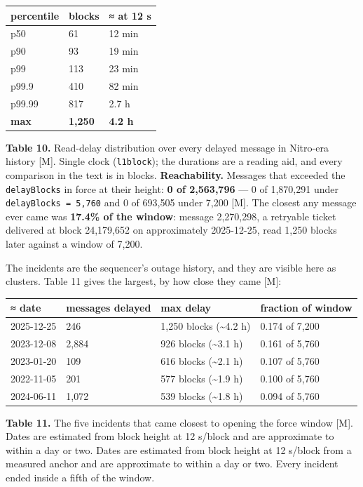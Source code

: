 \documentclass[conference]{IEEEtran}
\renewcommand{\_}{\textunderscore\allowbreak}
\begin{document}
\begin{table}[!t]
\centering
\small
\begin{tabular}{@{}lll@{}}
\toprule
percentile & blocks & ≈ at 12 s \\
\midrule
p50 & 61 & 12 min \\
p90 & 93 & 19 min \\
p99 & 113 & 23 min \\
p99.9 & 410 & 82 min \\
p99.99 & 817 & 2.7 h \\
\textbf{max} & \textbf{1,250} & \textbf{4.2 h} \\
\bottomrule
\end{tabular}
\par\vspace{5pt}
{\footnotesize\raggedright \textbf{Table 10.} Read-delay distribution over every delayed message in
Nitro-era history {[}M{]}. Single clock (\texttt{l1\_block}); the
durations are a reading aid, and every comparison in the text is in
blocks. \textbf{Reachability.} Messages that exceeded the
\texttt{delayBlocks} in force at their height: \textbf{0 of 2,563,796}
--- 0 of 1,870,291 under \texttt{delayBlocks\ =\ 5,760} and 0 of 693,505
under 7,200 {[}M{]}. The closest any message ever came was
\textbf{17.4\% of the window}: message 2,270,298, a retryable ticket
delivered at block 24,179,652 on approximately 2025-12-25, read 1,250
blocks later against a window of 7,200.\par}
\end{table}

The incidents are the sequencer's outage history, and they are visible
here as clusters. Table 11 gives the largest, by how close they came
{[}M{]}:

\begin{table}[!t]
\centering
\small
\begin{tabular}{@{}llll@{}}
\toprule
≈ date & messages delayed & max delay & fraction of window \\
\midrule
2025-12-25 & 246 & 1,250 blocks (\textasciitilde4.2 h) & 0.174 of
7,200 \\
2023-12-08 & 2,884 & 926 blocks (\textasciitilde3.1 h) & 0.161 of
5,760 \\
2023-01-20 & 109 & 616 blocks (\textasciitilde2.1 h) & 0.107 of 5,760 \\
2022-11-05 & 201 & 577 blocks (\textasciitilde1.9 h) & 0.100 of 5,760 \\
2024-06-11 & 1,072 & 539 blocks (\textasciitilde1.8 h) & 0.094 of
5,760 \\
\bottomrule
\end{tabular}
\par\vspace{5pt}
{\footnotesize\raggedright \textbf{Table 11.} The five incidents that came closest to opening the
force window {[}M{]}. Dates are estimated from block height at 12
s/block and are approximate to within a day or two. Dates are estimated
from block height at 12 s/block from a measured anchor and are
approximate to within a day or two. Every incident ended inside a fifth
of the window.\par}
\end{table}
\end{document}
